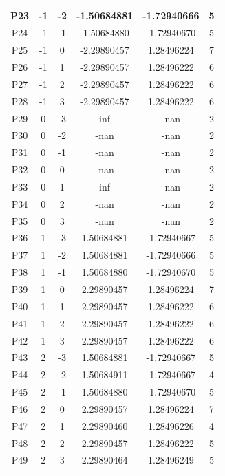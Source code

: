 \documentclass[a4paper,12pt]{article}
\begin{document}
\begin{longtable}{|c|c|c|c|c|c|}
    \hline
    P23 & -1 & -2 & -1.50684881 & -1.72940666 & 5 \\ 
    \hline
    P24 & -1 & -1 & -1.50684880 & -1.72940670 & 5 \\ 
    \hline
    P25 & -1 & 0 & -2.29890457 & 1.28496224 & 7 \\ 
    \hline
    P26 & -1 & 1 & -2.29890457 & 1.28496222 & 6 \\ 
    \hline
    P27 & -1 & 2 & -2.29890457 & 1.28496222 & 6 \\ 
    \hline
    P28 & -1 & 3 & -2.29890457 & 1.28496222 & 6 \\ 
    \hline
    P29 & 0 & -3 & inf & -nan & 2 \\ 
    \hline
    P30 & 0 & -2 & -nan & -nan & 2 \\ 
    \hline
    P31 & 0 & -1 & -nan & -nan & 2 \\ 
    \hline
    P32 & 0 & 0 & -nan & -nan & 2 \\ 
    \hline
    P33 & 0 & 1 & inf & -nan & 2 \\ 
    \hline
    P34 & 0 & 2 & -nan & -nan & 2 \\ 
    \hline
    P35 & 0 & 3 & -nan & -nan & 2 \\ 
    \hline
    P36 & 1 & -3 & 1.50684881 & -1.72940667 & 5 \\ 
    \hline
    P37 & 1 & -2 & 1.50684881 & -1.72940666 & 5 \\ 
    \hline
    P38 & 1 & -1 & 1.50684880 & -1.72940670 & 5 \\ 
    \hline
    P39 & 1 & 0 & 2.29890457 & 1.28496224 & 7 \\ 
    \hline
    P40 & 1 & 1 & 2.29890457 & 1.28496222 & 6 \\ 
    \hline
    P41 & 1 & 2 & 2.29890457 & 1.28496222 & 6 \\ 
    \hline
    P42 & 1 & 3 & 2.29890457 & 1.28496222 & 6 \\ 
    \hline
    P43 & 2 & -3 & 1.50684881 & -1.72940667 & 5 \\ 
    \hline
    P44 & 2 & -2 & 1.50684911 & -1.72940667 & 4 \\ 
    \hline
    P45 & 2 & -1 & 1.50684880 & -1.72940670 & 5 \\ 
    \hline
    P46 & 2 & 0 & 2.29890457 & 1.28496224 & 7 \\ 
    \hline
    P47 & 2 & 1 & 2.29890460 & 1.28496226 & 4 \\ 
    \hline
    P48 & 2 & 2 & 2.29890457 & 1.28496222 & 5 \\ 
    \hline
    P49 & 2 & 3 & 2.29890464 & 1.28496249 & 5 \\ 

\end{longtable}
\end{document}

